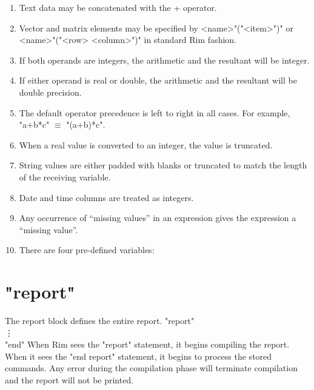 \begin{enumerate}
\item Text data may be concatenated with the + operator.
\item Vector and matrix elements may be specified
   by <name>"("<item>")" or <name>"("<row> <column>")"
   in standard Rim fashion.
\item If both operands are integers, the arithmetic
   and the resultant will be integer.
\item If either operand is real or double, the arithmetic
   and the resultant will be double precision.
\item The default operator precedence is left to right
   in all cases.  For example,
   \<"a+b*c" \qquad $\equiv$ \qquad  "(a+b)*c".\>
\item When a real value is converted to an integer, the value is truncated.
\item String values are either padded with blanks or truncated
   to match the length of the receiving variable.
\item Date and time columns are treated as integers.
\item Any occurrence of ``missing values'' in an expression
   gives the expression a ``missing value''.
\item There are four pre-defined variables:
\end{enumerate}
 
\section{"report"}
%
The report block defines the entire report.
\<"report"\\ \quad\vdots\\"end" \>
 When Rim sees the
"report" statement, it begins compiling the report.  When
it sees the "end report" statement, it begins to process the stored commands.
Any error during the compilation phase will terminate compilation
and the report will not be printed.
 
